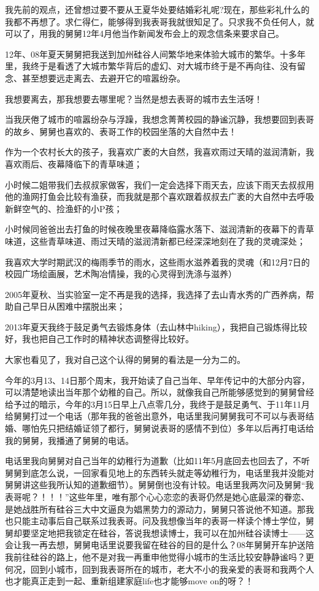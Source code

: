 \documentclass[9pt, b5paper]{article}
\begin{document}
我先前的观点，还曾想过要不要从王夏华处要结婚彩礼呢?现在，那些彩礼什么的我都不再想了。求仁得仁，能够得到我表哥我就很知足了。只求我不负任何人，就可以了，用我的舅舅12年4月他当作新闻发布会上的观念信条来要求自己。

12年、08年夏天舅舅把我送到加州硅谷人间繁华地来体验大城市的繁华。十多年里，我终于是看透了大城市繁华背后的虚幻、对大城市终于是不再向往、没有留念、甚至想要远走离去、去避开它的喧嚣纷杂。

我想要离去，那我想要去哪里呢？当然是想去表哥的城市去生活呀！

当我厌倦了城市的喧嚣纷杂与浮躁，我想念菁菁校园的静谧沉静，我想要回到表哥的故乡、舅舅也喜欢的、表哥工作的校园坐落的大自然中去！

作为一个农村长大的孩子，我喜欢广袤的大自然，我喜欢雨过天晴的滋润清新，我喜欢雨后、夜幕降临下的青草味道；

小时候二姐带我们去叔叔家做客，我们一定会选择下雨天去，应该下雨天去叔叔用他的渔网打鱼会比较有渔获，而我就是那个喜欢跟着叔叔去广袤的大自然中去呼吸新鲜空气的、捡渔虾的小P孩；

小时候同爸爸出去打鱼的时候夜晚里夜幕降临露水落下、滋润清新的夜幕下的青草味道，这些青草味道、雨过天晴的滋润清新都已经深深地刻在了我的灵魂深处；

我喜欢大学时期武汉的梅雨季节的雨水，这些雨水滋养着我的灵魂（和12月7日的校园广场绘画展，艺术陶冶情操，我的心灵得到洗涤与滋养）

2005年夏秋、当实验室一定不再是我的选择，我选择了去山青水秀的广西养病，帮助自己早日从困难中摆脱出来；

2013年夏天我终于鼓足勇气去锻炼身体（去山林中hiking），我把自己锻炼得比较好，我也把自己工作时的精神状态调整得比较好。

大家也看见了，我对自己这个认得的舅舅的看法是一分为二的。

今年的3月13、14日那个周末，我开始读了自己当年、早年传记中的大部分内容，可以清楚地读出当年那个幼稚的自己。所以，就像我自己所能够感觉到的舅舅曾经给予过的暗示，今年的3月15日早上八点零几分，我终于是鼓足勇气、于11年11月给舅舅打过一个电话（那年我的爸爸出意外，电话里我问舅舅我可不可以与表哥结婚、哪怕先只把结婚证领了都行，舅舅说表哥的感情不到位）多年以后再打电话给我的舅舅，我播通了舅舅的电话。 

电话里我向舅舅对自己当年的幼稚行为道歉（比如11年5月底回去也回去了，不听舅舅到底怎么说，一回家看见地上的东西转头就走等幼稚行为，电话里我并没能对舅舅讲这些我所认知的道歉细节）。舅舅倒也没有计较。电话里我两次问及舅舅“我表哥呢？！！！”这些年里，唯有那个心心恋恋的表哥仍然是她心底最深的眷恋、是她战胜所有硅谷三大中文逼良为娼黑势力的源动力，舅舅只答说他不知道。那我也只能主动事后自己联系过我表哥。问及我想像当年的表哥一样读个博士学位，舅舅却要坚定地把我锁定在硅谷，答说我想读博士，我可以在加州硅谷读博士——这会让我一再去想，舅舅电话里说要我留在硅谷的目的是什么？08年舅舅开车护送陪我前往硅谷的路上，他不是对我一再重申他觉得小城市的生活比较安静静谧吗？更何况，回到小城市，回到我表哥所在的城市，老大不小的我亲爱的表哥和我两个人也才能真正走到一起、重新组建家庭life也才能够move on的呀？！
\end{document}
